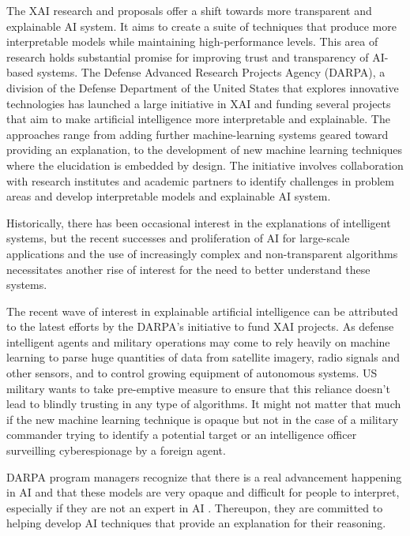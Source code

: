 The XAI research and proposals offer a shift towards more transparent and explainable AI system. It aims to create a suite of techniques that produce more interpretable models while maintaining high-performance levels. This area of research holds substantial promise for improving trust and transparency of AI-based systems.
The Defense Advanced Research Projects Agency (DARPA), a division of the Defense Department of the United States that explores innovative technologies has launched a large initiative in XAI and funding several projects that aim to make artificial intelligence more interpretable and explainable. The approaches range from adding further machine-learning systems geared toward providing an explanation, to the development of new machine learning techniques where the elucidation is embedded by design. The initiative involves collaboration with research institutes and academic partners to identify challenges in problem areas and develop interpretable models and explainable AI system.

Historically, there has been occasional interest in the explanations of intelligent systems\cite{Abdul}, but the recent successes and proliferation of AI for large-scale applications and the use of increasingly complex and non-transparent algorithms necessitates another rise of interest for the need to better understand these systems.

The recent wave of interest in explainable artificial intelligence can be attributed to the latest efforts by the DARPA's initiative to fund XAI projects. As defense intelligent agents and military operations may come to rely heavily on machine learning to parse huge quantities of data from satellite imagery, radio signals and other sensors, and to control growing equipment of autonomous systems. US military wants to take pre-emptive measure to ensure that this reliance doesn’t lead to blindly trusting in any type of algorithms. It might not matter that much if the new machine learning technique is opaque but not in the case of a military commander trying to identify a potential target \cite{Knight2017} or an intelligence officer surveilling cyberespionage by a foreign agent.

DARPA program managers recognize that there is a real advancement happening in AI and that these models are very opaque and difficult for people to interpret, especially if they are not an expert in AI \cite{Knight2017}. Thereupon, they are committed to helping develop AI techniques that provide an explanation for their reasoning.

